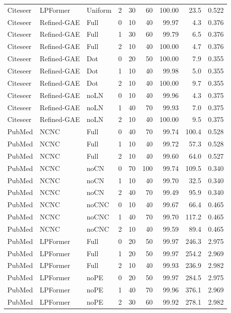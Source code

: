 {\begin{longtable}{lllrrrrrr}
Citeseer & LPFormer & Uniform & 2 & 30 & 60 & 100.00 & 23.5 & 0.522 \\
Citeseer & Refined-GAE & Full & 0 & 10 & 40 & 99.97 & 4.3 & 0.376 \\
Citeseer & Refined-GAE & Full & 1 & 30 & 60 & 99.79 & 6.5 & 0.376 \\
Citeseer & Refined-GAE & Full & 2 & 10 & 40 & 100.00 & 4.7 & 0.376 \\
Citeseer & Refined-GAE & Dot & 0 & 20 & 50 & 100.00 & 7.9 & 0.355 \\
Citeseer & Refined-GAE & Dot & 1 & 10 & 40 & 99.98 & 5.0 & 0.355 \\
Citeseer & Refined-GAE & Dot & 2 & 10 & 40 & 100.00 & 9.7 & 0.355 \\
Citeseer & Refined-GAE & noLN & 0 & 10 & 40 & 99.96 & 4.3 & 0.375 \\
Citeseer & Refined-GAE & noLN & 1 & 40 & 70 & 99.93 & 7.0 & 0.375 \\
Citeseer & Refined-GAE & noLN & 2 & 10 & 40 & 100.00 & 9.5 & 0.375 \\
PubMed & NCNC & Full & 0 & 40 & 70 & 99.74 & 100.4 & 0.528 \\
PubMed & NCNC & Full & 1 & 10 & 40 & 99.72 & 57.3 & 0.528 \\
PubMed & NCNC & Full & 2 & 10 & 40 & 99.60 & 64.0 & 0.527 \\
PubMed & NCNC & noCN & 0 & 70 & 100 & 99.74 & 109.5 & 0.340 \\
PubMed & NCNC & noCN & 1 & 10 & 40 & 99.70 & 32.5 & 0.340 \\
PubMed & NCNC & noCN & 2 & 40 & 70 & 99.49 & 95.9 & 0.340 \\
PubMed & NCNC & noCNC & 0 & 10 & 40 & 99.67 & 66.4 & 0.465 \\
PubMed & NCNC & noCNC & 1 & 40 & 70 & 99.70 & 117.2 & 0.465 \\
PubMed & NCNC & noCNC & 2 & 10 & 40 & 99.59 & 89.4 & 0.465 \\
PubMed & LPFormer & Full & 0 & 20 & 50 & 99.97 & 246.3 & 2.975 \\
PubMed & LPFormer & Full & 1 & 20 & 50 & 99.97 & 254.2 & 2.969 \\
PubMed & LPFormer & Full & 2 & 10 & 40 & 99.93 & 236.9 & 2.982 \\
PubMed & LPFormer & noPE & 0 & 20 & 50 & 99.97 & 284.5 & 2.975 \\
PubMed & LPFormer & noPE & 1 & 40 & 70 & 99.96 & 376.1 & 2.969 \\
PubMed & LPFormer & noPE & 2 & 30 & 60 & 99.92 & 278.1 & 2.982 \\

\end{longtable}}

